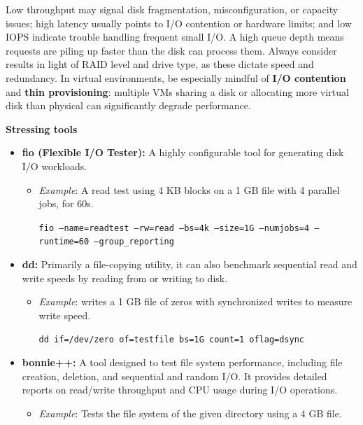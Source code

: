 Low throughput may signal disk fragmentation, misconfiguration, or capacity issues; high latency usually points to I/O contention or hardware limits; and low IOPS indicate trouble handling frequent small I/O. A high queue depth means requests are piling up faster than the disk can process them. Always consider results in light of RAID level and drive type, as these dictate speed and redundancy. In virtual environments, be especially mindful of \textbf{I/O contention} and \textbf{thin provisioning}: multiple VMs sharing a disk or allocating more virtual disk than physical can significantly degrade performance.

\begin{exampleblock}

\textbf{Stressing tools}

\begin{itemize}
    \item \textbf{fio (Flexible I/O Tester):} A highly configurable tool for generating disk I/O workloads.
    \begin{itemize}
        \item \textit{Example}: A read test using 4 KB blocks on a 1 GB file with 4 parallel jobs, for 60s.

        \begin{center}
        \tt{fio --name=readtest --rw=read --bs=4k --size=1G --numjobs=4 --runtime=60 --group\_reporting}
        \end{center}
    \end{itemize}

    \item \textbf{dd:} Primarily a file-copying utility, it can also benchmark sequential read and write speeds by reading from or writing to disk.
    \begin{itemize}
        \item \textit{Example}: writes a 1 GB file of zeros with synchronized writes to measure write speed.
   
        \begin{center}
        \tt{dd if=/dev/zero of=testfile bs=1G count=1 oflag=dsync}
        \end{center}
    \end{itemize}

    \item \textbf{bonnie++:} A tool designed to test file system performance, including file creation, deletion, and sequential and random I/O. It provides detailed reports on read/write throughput and CPU usage during I/O operations.
    \begin{itemize}
        \item \textit{Example}: Tests the file system of the given directory using a 4 GB file.


\end{itemize}
\end{itemize}
\end{exampleblock}
